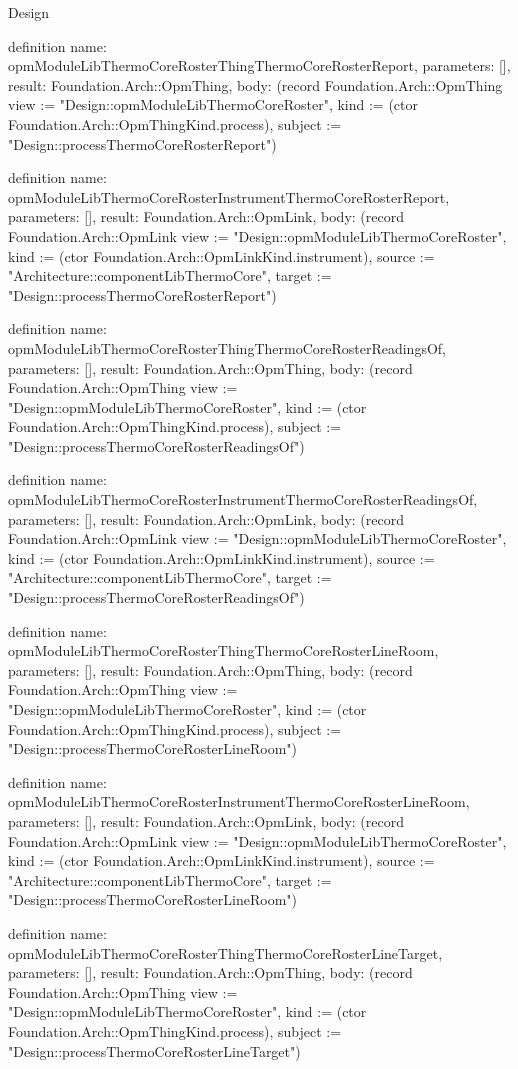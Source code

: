 \begin{lexlean}{Design}
\begin{semanticmodule}
definition{
  name: opmModuleLibThermoCoreRosterThingThermoCoreRosterReport,
  parameters: [],
  result: Foundation.Arch::OpmThing,
  body: (record Foundation.Arch::OpmThing {view := "Design::opmModuleLibThermoCoreRoster", kind := (ctor Foundation.Arch::OpmThingKind.process), subject := "Design::processThermoCoreRosterReport"})
}

definition{
  name: opmModuleLibThermoCoreRosterInstrumentThermoCoreRosterReport,
  parameters: [],
  result: Foundation.Arch::OpmLink,
  body: (record Foundation.Arch::OpmLink {view := "Design::opmModuleLibThermoCoreRoster", kind := (ctor Foundation.Arch::OpmLinkKind.instrument), source := "Architecture::componentLibThermoCore", target := "Design::processThermoCoreRosterReport"})
}

definition{
  name: opmModuleLibThermoCoreRosterThingThermoCoreRosterReadingsOf,
  parameters: [],
  result: Foundation.Arch::OpmThing,
  body: (record Foundation.Arch::OpmThing {view := "Design::opmModuleLibThermoCoreRoster", kind := (ctor Foundation.Arch::OpmThingKind.process), subject := "Design::processThermoCoreRosterReadingsOf"})
}

definition{
  name: opmModuleLibThermoCoreRosterInstrumentThermoCoreRosterReadingsOf,
  parameters: [],
  result: Foundation.Arch::OpmLink,
  body: (record Foundation.Arch::OpmLink {view := "Design::opmModuleLibThermoCoreRoster", kind := (ctor Foundation.Arch::OpmLinkKind.instrument), source := "Architecture::componentLibThermoCore", target := "Design::processThermoCoreRosterReadingsOf"})
}

definition{
  name: opmModuleLibThermoCoreRosterThingThermoCoreRosterLineRoom,
  parameters: [],
  result: Foundation.Arch::OpmThing,
  body: (record Foundation.Arch::OpmThing {view := "Design::opmModuleLibThermoCoreRoster", kind := (ctor Foundation.Arch::OpmThingKind.process), subject := "Design::processThermoCoreRosterLineRoom"})
}

definition{
  name: opmModuleLibThermoCoreRosterInstrumentThermoCoreRosterLineRoom,
  parameters: [],
  result: Foundation.Arch::OpmLink,
  body: (record Foundation.Arch::OpmLink {view := "Design::opmModuleLibThermoCoreRoster", kind := (ctor Foundation.Arch::OpmLinkKind.instrument), source := "Architecture::componentLibThermoCore", target := "Design::processThermoCoreRosterLineRoom"})
}

definition{
  name: opmModuleLibThermoCoreRosterThingThermoCoreRosterLineTarget,
  parameters: [],
  result: Foundation.Arch::OpmThing,
  body: (record Foundation.Arch::OpmThing {view := "Design::opmModuleLibThermoCoreRoster", kind := (ctor Foundation.Arch::OpmThingKind.process), subject := "Design::processThermoCoreRosterLineTarget"})
}


\end{semanticmodule}
\end{lexlean}
